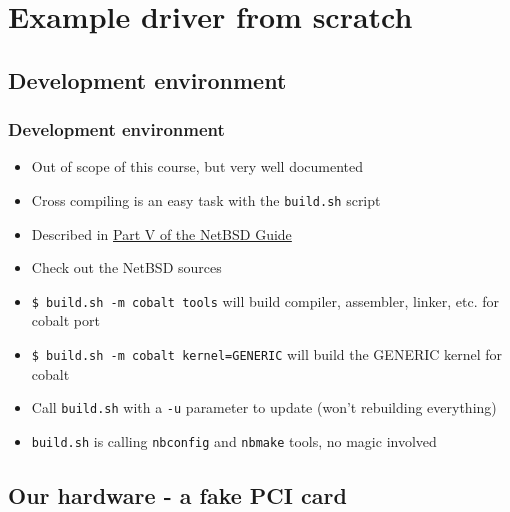 \documentclass[dvipsnames,table]{beamer}
\begin{document}
\section{Example driver from scratch}

\subsection{Development environment}

\begin{frame}
\frametitle{Development environment}
\begin{itemize}
	\item Out of scope of this course, but very well documented
	\item Cross compiling is an easy task with the {\tt build.sh} script
	\item Described in \href{http://www.netbsd.org/docs/guide/en/part-compile.html}{Part V of the NetBSD Guide}
	\item Check out the NetBSD sources
	\item {\tt \$ build.sh -m cobalt tools} will build compiler, assembler, linker, etc. for cobalt port
	\item {\tt \$ build.sh -m cobalt kernel=GENERIC} will build the GENERIC kernel for cobalt
	\item Call {\tt build.sh} with a {\tt -u} parameter to update (won't rebuilding everything)
	\item {\tt build.sh} is calling {\tt nbconfig} and {\tt nbmake} tools, no magic involved
\end{itemize}
\end{frame}

\subsection{Our hardware - a fake PCI card}
\end{document}
